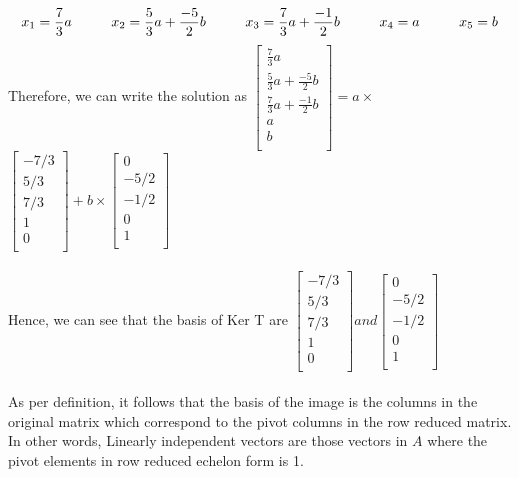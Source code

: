 \documentclass[12pt]{article}
\newcommand\tab[1][1cm]{\hspace*{#1}}
\begin{document}
$$x_1 = \frac{7}{3}a \tab x_2 = \frac{5}{3}a + \frac{-5}{2}b \tab x_3 = \frac{7}{3}a + \frac{-1}{2}b \tab x_4 = a \tab x_5 = b $$
\noindent \tab Therefore, we can write the solution as
$\left[ \begin{array}{c}
  \frac{7}{3}a\\
 \frac{5}{3}a + \frac{-5}{2}b\\
  \frac{7}{3}a + \frac{-1}{2}b\\
  a\\
  b\\
  \end{array} \right] = a \times$ 
  $\left[ \begin{array}{c}
  -7/3\\
 5/3\\  
  7/3\\ 
  1\\ 
  0\\ 
  \end{array} \right] + b \times 
  \left[ \begin{array}{c}
  0\\
 -5/2\\  
  -1/2\\ 
  0\\ 
  1\\ 
  \end{array} \right] $
\\ \\
\noindent \tab Hence, we can see that the basis of Ker T are $ \left[ \begin{array}{c}
  -7/3\\
 5/3\\  
  7/3\\ 
  1\\ 
  0\\ 
  \end{array} \right] and
  \left[ \begin{array}{c}
  0\\
 -5/2\\  
  -1/2\\ 
  0\\ 
  1\\ 
  \end{array} \right] $
\\ \\
\clearpage
\noindent \tab As per definition, it follows that the basis of the image is the columns in the original matrix which correspond to the pivot columns in the row reduced matrix. In other words, Linearly independent vectors are those vectors in $A$ where the pivot elements in row reduced echelon form is 1.\\
\end{document}
